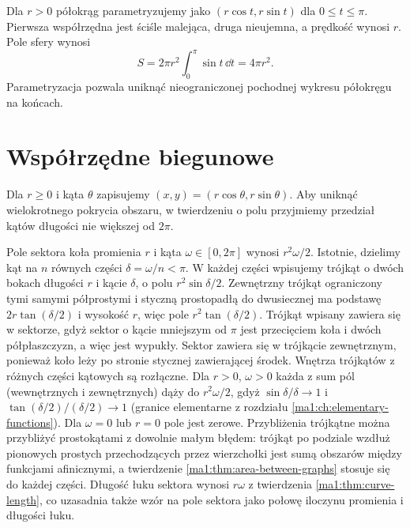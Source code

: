 \begin{przyklad}
\label{ma1:ex:sphere-surface}
Dla $r>0$ półokrąg parametryzujemy jako $(r\cos t,r\sin t)$ dla $0\le t\le\pi$. Pierwsza współrzędna jest ściśle malejąca, druga nieujemna, a prędkość wynosi $r$. Pole sfery wynosi
\[
 S=2\pi r^2\int_0^\pi\sin t\,\dd t=4\pi r^2.
\]
Parametryzacja pozwala uniknąć nieograniczonej pochodnej wykresu półokręgu na końcach.
\end{przyklad}

\section{Współrzędne biegunowe}
Dla $r\ge0$ i kąta $\theta$ zapisujemy $(x,y)=(r\cos\theta,r\sin\theta)$. Aby uniknąć wielokrotnego pokrycia obszaru, w twierdzeniu o polu przyjmiemy przedział kątów długości nie większej od $2\pi$.

Pole sektora koła promienia $r$ i kąta $\omega\in[0,2\pi]$ wynosi $r^2\omega/2$. Istotnie, dzielimy kąt na $n$ równych części $\delta=\omega/n<\pi$. W każdej części wpisujemy trójkąt o dwóch bokach długości $r$ i kącie $\delta$, o polu $r^2\sin\delta/2$. Zewnętrzny trójkąt ograniczony tymi samymi półprostymi i styczną prostopadłą do dwusiecznej ma podstawę $2r\tan(\delta/2)$ i wysokość $r$, więc pole $r^2\tan(\delta/2)$. Trójkąt wpisany zawiera się w sektorze, gdyż sektor o kącie mniejszym od $\pi$ jest przecięciem koła i dwóch półpłaszczyzn, a więc jest wypukły. Sektor zawiera się w trójkącie zewnętrznym, ponieważ koło leży po stronie stycznej zawierającej środek. Wnętrza trójkątów z różnych części kątowych są rozłączne. Dla $r>0$, $\omega>0$ każda z sum pól (wewnętrznych i zewnętrznych) dąży do $r^2\omega/2$, gdyż $\sin\delta/\delta\to1$ i $\tan(\delta/2)/(\delta/2)\to1$ (granice elementarne z rozdziału \ref{ma1:ch:elementary-functions}). Dla $\omega=0$ lub $r=0$ pole jest zerowe. Przybliżenia trójkątne można przybliżyć prostokątami z dowolnie małym błędem: trójkąt po podziale wzdłuż pionowych prostych przechodzących przez wierzchołki jest sumą obszarów między funkcjami afinicznymi, a twierdzenie \ref{ma1:thm:area-between-graphs} stosuje się do każdej części. Długość łuku sektora wynosi $r\omega$ z twierdzenia \ref{ma1:thm:curve-length}, co uzasadnia także wzór na pole sektora jako połowę iloczynu promienia i długości łuku.

